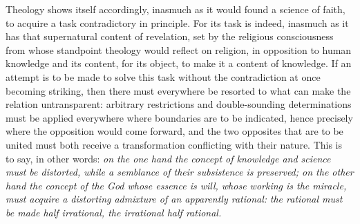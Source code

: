 \documentclass[12pt,a4paper]{book}
\begin{document}
Theology shows itself accordingly, inasmuch as it would found a science of faith, to acquire a
task contradictory in principle. For its task is indeed, inasmuch as it has that supernatural
content of revelation, set by the religious consciousness from whose standpoint theology would
reflect on religion, in opposition to human knowledge and its content, for its object, to make
it a content of knowledge. If an attempt is to be made to solve this task without the
contradiction at once becoming striking, then there must everywhere be resorted to what can
make the relation untransparent: arbitrary restrictions and double-sounding determinations must
be applied everywhere where boundaries are to be indicated, hence precisely where the opposition
would come forward, and the two opposites that are to be united must both receive a transformation
conflicting with their nature. This is to say, in other words: \emph{on the one hand the concept
of knowledge and science must be distorted, while a semblance of their subsistence is preserved;
on the other hand the concept of the God whose essence is will, whose working is the miracle, must
acquire a distorting admixture of an apparently rational:} \emph{the rational must be made
half irrational, the irrational half rational.}
\end{document}
